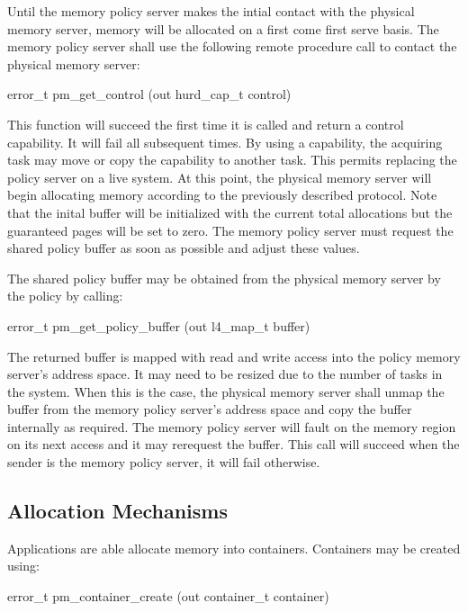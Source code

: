 Until the memory policy server makes the intial contact with the
physical memory server, memory will be allocated on a first come first
serve basis.  The memory policy server shall use the following remote
procedure call to contact the physical memory server:

\begin{code}
error\_t pm\_get\_control (out hurd\_cap\_t control)
\end{code}

\noindent
This function will succeed the first time it is called and return a
control capability.  It will fail all subsequent times.  By using a
capability, the acquiring task may move or copy the capability to
another task.  This permits replacing the policy server on a live
system.  At this point, the physical memory server will begin
allocating memory according to the previously described protocol.
Note that the inital buffer will be initialized with the current total
allocations but the guaranteed pages will be set to zero.  The memory
policy server must request the shared policy buffer as soon as
possible and adjust these values.

The shared policy buffer may be obtained from the physical memory
server by the policy by calling:

\begin{code}
error\_t pm\_get\_policy\_buffer (out l4\_map\_t buffer)
\end{code}

\noindent
The returned buffer is mapped with read and write access into the
policy memory server's address space.  It may need to be resized due
to the number of tasks in the system.  When this is the case, the
physical memory server shall unmap the buffer from the memory policy
server's address space and copy the buffer internally as required.
The memory policy server will fault on the memory region on its next
access and it may rerequest the buffer.  This call will succeed when
the sender is the memory policy server, it will fail otherwise.

\subsection{Allocation Mechanisms}

Applications are able allocate memory into containers.  Containers may
be created using:

\begin{code}
error\_t pm\_container\_create (out container\_t container)
\end{code}

